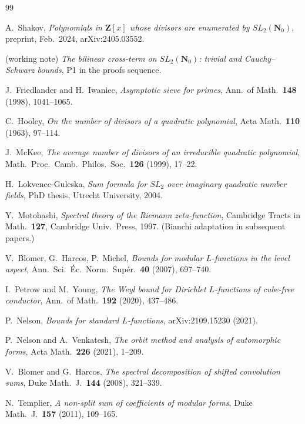 \documentclass[11pt]{article}
\theoremstyle{definition}
\newcommand{\Nz}{\mathbf{N}_0}
\newcommand{\Z}{\mathbf{Z}}
\newcommand{\SLNz}{SL_2(\Nz)}
\begin{document}
\begin{thebibliography}{99}

 A.~Shakov, \emph{Polynomials in $\Z[x]$ whose divisors are enumerated by $\SLNz$}, preprint, Feb.\ 2024, arXiv:2405.03552.

 (working note) \emph{The bilinear cross-term on $\SLNz$: trivial and Cauchy--Schwarz bounds}, P1 in the proofs sequence.

 J.~Friedlander and H.~Iwaniec, \emph{Asymptotic sieve for primes}, Ann.\ of Math.\ \textbf{148} (1998), 1041--1065.

 C.~Hooley, \emph{On the number of divisors of a quadratic polynomial}, Acta Math.\ \textbf{110} (1963), 97--114.

 J.~McKee, \emph{The average number of divisors of an irreducible quadratic polynomial}, Math.\ Proc.\ Camb.\ Philos.\ Soc.\ \textbf{126} (1999), 17--22.

 H.~Lokvenec-Guleska, \emph{Sum formula for $SL_2$ over imaginary quadratic number fields}, PhD thesis, Utrecht University, 2004.

 Y.~Motohashi, \emph{Spectral theory of the Riemann zeta-function}, Cambridge Tracts in Math.\ \textbf{127}, Cambridge Univ.\ Press, 1997. (Bianchi adaptation in subsequent papers.)

 V.~Blomer, G.~Harcos, P.~Michel, \emph{Bounds for modular $L$-functions in the level aspect}, Ann.\ Sci.\ \'Ec.\ Norm.\ Sup\'er.\ \textbf{40} (2007), 697--740.

 I.~Petrow and M.~Young, \emph{The Weyl bound for Dirichlet $L$-functions of cube-free conductor}, Ann.\ of Math.\ \textbf{192} (2020), 437--486.

 P.~Nelson, \emph{Bounds for standard $L$-functions}, arXiv:2109.15230 (2021).

 P.~Nelson and A.~Venkatesh, \emph{The orbit method and analysis of automorphic forms}, Acta Math.\ \textbf{226} (2021), 1--209.

 V.~Blomer and G.~Harcos, \emph{The spectral decomposition of shifted convolution sums}, Duke Math.\ J.\ \textbf{144} (2008), 321--339.

 N.~Templier, \emph{A non-split sum of coefficients of modular forms}, Duke Math.\ J.\ \textbf{157} (2011), 109--165.

\end{thebibliography}
\end{document}
